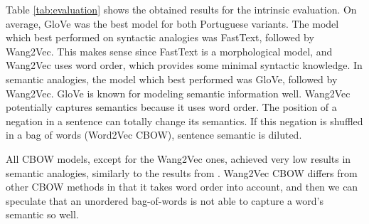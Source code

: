 Table \ref{tab:evaluation} shows the obtained results for the intrinsic evaluation. On average, GloVe was the best model for both Portuguese variants. The model which best performed on syntactic analogies was FastText, followed by Wang2Vec. This makes sense since FastText is a morphological model, and Wang2Vec uses word order, which provides some minimal syntactic knowledge. In semantic analogies, the model which best performed was GloVe, followed by Wang2Vec. GloVe is known for modeling semantic information well. Wang2Vec potentially captures semantics because it uses word order. The position of a negation in a sentence can totally change its semantics. If this negation is shuffled in a bag of words (Word2Vec CBOW), sentence semantic is diluted.

All CBOW models, except for the Wang2Vec ones, achieved very low results in semantic analogies, similarly to the results from \cite{mikolovetal2013}. %
Wang2Vec CBOW differs from other CBOW methods in that it takes word order into account, and then we can speculate that an unordered bag-of-words is not able to capture a word's semantic so well.

